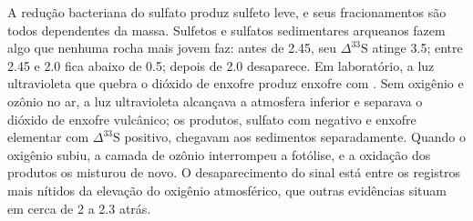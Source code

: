 A redução bacteriana do sulfato produz sulfeto leve, e seus fracionamentos são
todos dependentes da massa. Sulfetos e sulfatos sedimentares arqueanos fazem algo que nenhuma
rocha mais jovem faz: antes de \qty{2.45}{\Ga}, seu $\Delta^{33}\mathrm S$ atinge
\qty{3.5}{\permil}; entre 2.45 e \qty{2.0}{\Ga} fica abaixo de
\qty{0.5}{\permil}; depois de \qty{2.0}{\Ga} desaparece. Em laboratório,
a luz ultravioleta que quebra o dióxido de enxofre produz enxofre com .
Sem oxigênio e ozônio no ar, a luz ultravioleta alcançava a atmosfera inferior e
separava o dióxido de enxofre vulcânico; os produtos, sulfato com
negativo e enxofre elementar com $\Delta^{33}\mathrm S$ positivo, chegavam aos
sedimentos separadamente. Quando o oxigênio subiu, a camada de ozônio interrompeu a
fotólise, e a oxidação dos produtos os misturou de novo. O
desaparecimento do sinal está entre os registros mais nítidos da elevação do
oxigênio atmosférico, que outras evidências situam em cerca de 2 a \qty{2.3}{\Ga}
atrás.

\begin{omfigure}

\par{}\label{fig:b3:stable-isotopes:three-isotope}
\end{omfigure}

